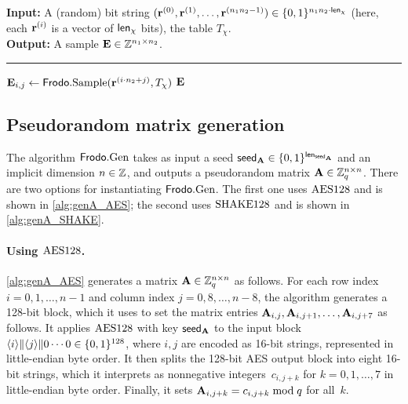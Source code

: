 \begin{algorithm}[H]
\caption{\label{alg:samplevecchi} $\Frodo.\SampV$}
{\bf Input:} A (random) bit string $(\mathbf{r}^{(0)}, \mathbf{r}^{(1)}, \dots, \mathbf{r}^{(n_1n_2-1)}) \in \{0,1\}^{n_1n_2 \cdot {\mathsf{len}_{\chi}}}$ (here, each $\mathbf{r}^{(i)}$ is a vector of ${\mathsf{len}_{\chi}}$ bits), the
  table $T_{\chi}$.\\
{\bf Output:} A sample $\mathbf{E} \in \mathbb{Z}^{n_1\times n_2}$.\\[-1.5ex]
\rule{\linewidth}{.5pt}
\vspace{-0.5cm}
\begin{algorithmic}[1]
    \STATE $\mathbf{E}_{i,j} \gets \textsf{\upshape\mdseries Frodo}.\textrm{\upshape\mdseries Sample}(\mathbf{r}^{(i\cdot n_2 + j)}, T_\chi)$
    \ENDFOR
    \ENDFOR
    \RETURN$\mathbf{E}$
\end{algorithmic}
\end{algorithm}

\subsection{Pseudorandom matrix generation}
\label{sec:genA}

The algorithm $\textsf{\upshape\mdseries Frodo}.\textrm{\upshape\mdseries Gen}$ takes as input a seed
${\mathsf{seed}_{\mathbf{A}}}\in\{0,1\}^{\mathsf{len}_{{\mathsf{seed}_{\mathbf{A}}}}}$ and an implicit dimension $n\in\mathbb{Z}$, and outputs
a pseudorandom matrix $\mathbf{A}\in \mathbb{Z}_q^{n\times n}$. There are two
options for instantiating $\textsf{\upshape\mdseries Frodo}.\textrm{\upshape\mdseries Gen}$. The first one uses
$\textrm{\upshape\mdseries AES128}$ and is shown in \autoref{alg:genA_AES}; the second
uses $\textrm{\upshape\mdseries SHAKE}128$ and is shown in \autoref{alg:genA_SHAKE}.

\paragraph{Using $\textrm{\upshape\mdseries AES128}$.}

\autoref{alg:genA_AES} generates a matrix
$\mathbf{A} \in \mathbb{Z}_{q}^{n\times n}$ as follows.  For each row
index $i=0,1,\ldots,n-1$ and column index $j=0,8,\ldots,n-8$, the
algorithm generates a 128-bit block, which it uses to set the matrix
entries $\mathbf{A}_{i,j}, \mathbf{A}_{i,j+1}, \ldots, \mathbf{A}_{i,j+7}$ as follows.  It
applies $\textrm{\upshape\mdseries AES128}$ with key ${\mathsf{seed}_{\mathbf{A}}}$ to the input block
$\langle i\rangle \| \langle j\rangle \| 0 \cdots 0 \in \{0,1\}^{128}$, where $i,j$ are
encoded as 16-bit strings, represented in little-endian byte order. It then splits the 128-bit AES output block
into eight 16-bit strings, which it interprets as nonnegative
integers~$c_{i,j+k}$ for $k=0,1,\ldots,7$ in little-endian byte order.  Finally, it sets
$\mathbf{A}_{i,j+k}= c_{i,j+k} \bmod q$ for all~$k$.

